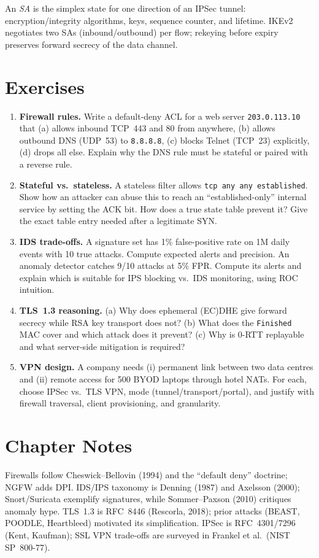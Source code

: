 \begin{definition}
An \emph{SA} is the simplex state for one direction of an IPSec tunnel: encryption/integrity algorithms, keys, sequence counter, and lifetime. IKEv2 negotiates two SAs (inbound/outbound) per flow; rekeying before expiry preserves forward secrecy of the data channel.
\end{definition}

\section{Exercises}
\label{sec:ch06-exercises}
\begin{enumerate}[label=E6.\arabic*, leftmargin=*, itemsep=0.6em]
    \item \textbf{Firewall rules.} Write a default-deny ACL for a web server \texttt{203.0.113.10} that (a) allows inbound TCP~443 and 80 from anywhere, (b) allows outbound DNS (UDP~53) to \texttt{8.8.8.8}, (c) blocks Telnet (TCP~23) explicitly, (d) drops all else. Explain why the DNS rule must be stateful or paired with a reverse rule.
    \item \textbf{Stateful vs.\ stateless.} A stateless filter allows \texttt{tcp any any established}. Show how an attacker can abuse this to reach an ``established-only'' internal service by setting the ACK bit. How does a true state table prevent it? Give the exact table entry needed after a legitimate SYN.
    \item \textbf{IDS trade-offs.} A signature set has 1\% false-positive rate on 1M daily events with 10 true attacks. Compute expected alerts and precision. An anomaly detector catches 9/10 attacks at 5\% FPR. Compute its alerts and explain which is suitable for IPS blocking vs.\ IDS monitoring, using ROC intuition.
    \item \textbf{TLS~1.3 reasoning.} (a) Why does ephemeral (EC)DHE give forward secrecy while RSA key transport does not? (b) What does the \texttt{Finished} MAC cover and which attack does it prevent? (c) Why is 0-RTT replayable and what server-side mitigation is required?
    \item \textbf{VPN design.} A company needs (i) permanent link between two data centres and (ii) remote access for 500 BYOD laptops through hotel NATs. For each, choose IPSec vs.\ TLS VPN, mode (tunnel/transport/portal), and justify with firewall traversal, client provisioning, and granularity.
\end{enumerate}

\section*{Chapter Notes}
Firewalls follow Cheswick--Bellovin (1994) and the ``default deny'' doctrine; NGFW adds DPI. IDS/IPS taxonomy is Denning (1987) and Axelsson (2000); Snort/Suricata exemplify signatures, while Sommer--Paxson (2010) critiques anomaly hype. TLS~1.3 is RFC~8446 (Rescorla, 2018); prior attacks (BEAST, POODLE, Heartbleed) motivated its simplification. IPSec is RFC~4301/7296 (Kent, Kaufman); SSL VPN trade-offs are surveyed in Frankel et al.~(NIST SP~800-77).

